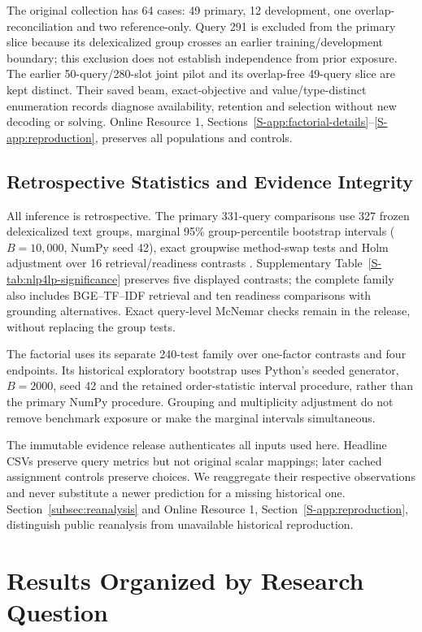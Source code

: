 \documentclass[pdflatex,iicol,sn-basic,Numbered]{sn-jnl}
\begin{document}
The original collection has 64 cases: 49 primary, 12 development, one overlap-reconciliation and two reference-only. Query 291 is excluded from the primary slice because its delexicalized group crosses an earlier training/development boundary; this exclusion does not establish independence from prior exposure. The earlier 50-query/280-slot joint pilot and its overlap-free 49-query slice are kept distinct. Their saved beam, exact-objective and value/type-distinct enumeration records diagnose availability, retention and selection without new decoding or solving. Online Resource 1, Sections~\ref{S-app:factorial-details}--\ref{S-app:reproduction}, preserves all populations and controls.

\subsection{Retrospective Statistics and Evidence Integrity}
\label{subsec:exp_significance}
All inference is retrospective. The primary 331-query comparisons use 327 frozen delexicalized text groups, marginal 95\% group-percentile bootstrap intervals ($B=10{,}000$, NumPy seed 42), exact groupwise method-swap tests and Holm adjustment over 16 retrieval/readiness contrasts \cite{holm1979followup}. Supplementary Table~\ref{S-tab:nlp4lp-significance} preserves five displayed contrasts; the complete family also includes BGE--TF--IDF retrieval and ten readiness comparisons with grounding alternatives. Exact query-level McNemar checks remain in the release, without replacing the group tests.

The factorial uses its separate 240-test family over one-factor contrasts and four endpoints. Its historical exploratory bootstrap uses Python's seeded generator, $B=2000$, seed 42 and the retained order-statistic interval procedure, rather than the primary NumPy procedure. Grouping and multiplicity adjustment do not remove benchmark exposure or make the marginal intervals simultaneous.

The immutable evidence release authenticates all inputs used here. Headline CSVs preserve query metrics but not original scalar mappings; later cached assignment controls preserve choices. We reaggregate their respective observations and never substitute a newer prediction for a missing historical one. Section~\ref{subsec:reanalysis} and Online Resource 1, Section~\ref{S-app:reproduction}, distinguish public reanalysis from unavailable historical reproduction.

\section{Results Organized by Research Question}
\label{sec:experiments}
\end{document}

